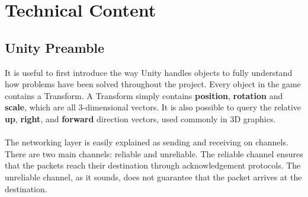 \documentclass[11pt,a4paper]{article}
\begin{document}
\pagebreak


 \section{Technical Content}

 \subsection{Unity Preamble}
 It is useful to first introduce the way Unity handles objects to fully understand how problems have been solved throughout the project. 
 Every object in the game contains a Transform. A Transform simply contains \textbf{position}, \textbf{rotation} and \textbf{scale}, which are all 3-dimensional vectors. It is also possible to query the relative \textbf{up}, \textbf{right}, and \textbf{forward} direction vectors, used commonly in 3D graphics. \\ \\
\noindent
 The networking layer is easily explained as sending and receiving on channels. There are two main channels: reliable and unreliable. The reliable channel ensures that the packets reach their destination through acknowledgement protocols. The unreliable channel, as it sounds, does not guarantee that the packet arrives at the destination.
 
\end{document}
